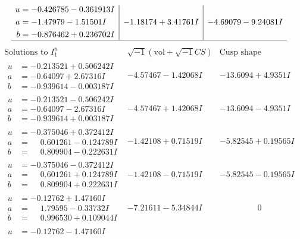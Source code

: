 \documentclass[1p]{elsarticle_modified}
\theoremstyle{definition}
\newcommand{\I}{\sqrt{-1}}
\begin{document}
$$\begin{array}{c|c|c}
\begin{aligned}
u &= -0.426785 - 0.361913 I \\
a &= -1.47979 - 1.51501 I \\
b &= -0.876462 + 0.236702 I\end{aligned}
 & -1.18174 + 3.41761 I & -4.69079 - 9.24081 I\\
 \hline 
 \end{array}$$\newpage$$\begin{array}{c|c|c}  
\text{Solutions to }I^u_{1}& \I (\text{vol} + \sqrt{-1}CS) & \text{Cusp shape}\\
 \hline 
\begin{aligned}
u &= -0.213521 + 0.506242 I \\
a &= -0.64097 + 2.67316 I \\
b &= -0.939614 - 0.003187 I\end{aligned}
 & -4.57467 - 1.42068 I & -13.6094 + 4.9351 I \\ \hline\begin{aligned}
u &= -0.213521 - 0.506242 I \\
a &= -0.64097 - 2.67316 I \\
b &= -0.939614 + 0.003187 I\end{aligned}
 & -4.57467 + 1.42068 I & -13.6094 - 4.9351 I \\ \hline\begin{aligned}
u &= -0.375046 + 0.372412 I \\
a &= \phantom{-}0.601261 - 0.124789 I \\
b &= \phantom{-}0.809904 - 0.222631 I\end{aligned}
 & -1.42108 + 0.71519 I & -5.82545 + 0.19565 I \\ \hline\begin{aligned}
u &= -0.375046 - 0.372412 I \\
a &= \phantom{-}0.601261 + 0.124789 I \\
b &= \phantom{-}0.809904 + 0.222631 I\end{aligned}
 & -1.42108 - 0.71519 I & -5.82545 - 0.19565 I \\ \hline\begin{aligned}
u &= -0.12762 + 1.47160 I \\
a &= \phantom{-}1.79595 - 0.33732 I \\
b &= \phantom{-}0.996530 + 0.109044 I\end{aligned}
 & -7.21611 - 5.34844 I & \phantom{-0.000000 } 0 \\ \hline\begin{aligned}
u &= -0.12762 - 1.47160 I \\

\end{aligned}
\end{array}$$
\end{document}
